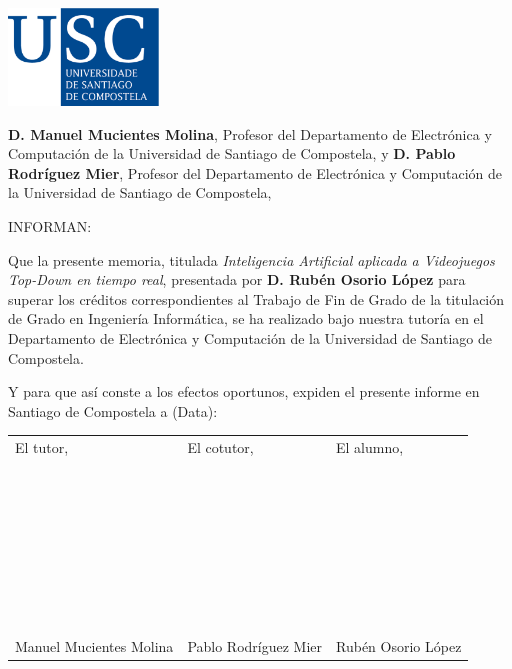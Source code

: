 \pagestyle{plain}
\includegraphics[width=4cm]{figuras/logo_usc.eps}

\vspace{1cm}
{\bf D. Manuel Mucientes Molina}, Profesor del Departamento de Electrónica y Computación de la Universidad de Santiago de Compostela, y {\bf D. Pablo Rodríguez Mier}, Profesor del Departamento de Electrónica y Computación de la Universidad de Santiago de Compostela,

\vspace{1cm}
INFORMAN:

\vspace{1cm}
Que la presente memoria, titulada {\it Inteligencia Artificial aplicada a Videojuegos Top-Down en tiempo real}, presentada por {\bf D. Rubén Osorio López} para superar los créditos correspondientes al Trabajo de Fin de Grado de la titulación de Grado en Ingeniería Informática, se ha realizado bajo nuestra tutoría en el Departamento de Electrónica y Computación de la Universidad de Santiago de Compostela.

\vspace{1cm}
Y para que así conste a los efectos oportunos, expiden el presente informe en Santiago de Compostela a (Data):

\vspace{2cm}
\begin{tabular}{lll}
El tutor, & El cotutor, & El alumno, \\
~ \\
~ \\
~ \\
~ \\
~ \\
~ \\
~ \\
Manuel Mucientes Molina & Pablo Rodríguez Mier & Rubén Osorio López
\end{tabular}


